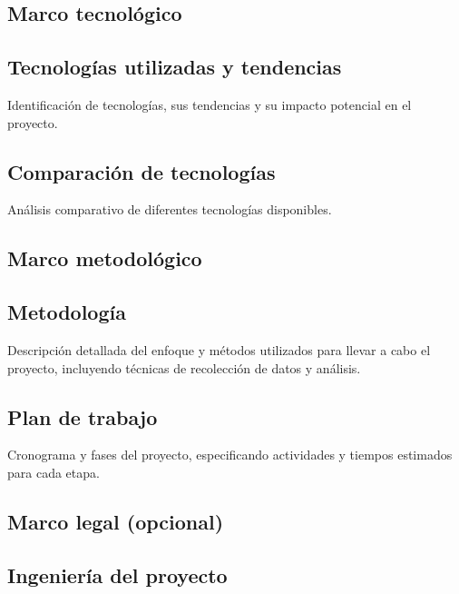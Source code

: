 \documentclass[12pt,letterpaper]{report}
\begin{document}
	\newpage
	\begin{center}
	\section{Marco tecnológico}
	\end{center}
	
	\subsection{Tecnologías utilizadas y tendencias}
	Identificación de tecnologías, sus tendencias y su impacto potencial en el proyecto.
	
	\subsection{Comparación de tecnologías}
	Análisis comparativo de diferentes tecnologías disponibles.
	
	\newpage
	\begin{center}
	\section{Marco metodológico}
	\end{center}
	
	\subsection{Metodología}
	Descripción detallada del enfoque y métodos utilizados para llevar a cabo el proyecto, incluyendo técnicas de recolección de datos y análisis.
	
	\subsection{Plan de trabajo}
	Cronograma y fases del proyecto, especificando actividades y tiempos estimados para cada etapa.
	\newpage
	\begin{center}
	\section{Marco legal (opcional)}
	\end{center}
	
	\newpage
	\begin{center}
	\section{Ingeniería del proyecto}
	\end{center}
	
\end{document}
